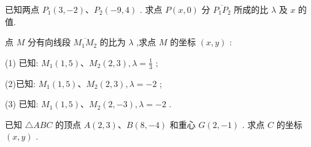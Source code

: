\documentclass[lang=cn,newtx,10.5pt,scheme=chinese]{elegantbook}
\begin{document}
\begin{problemset}[练习]

\item 已知两点 \({P}_{1}\left( {3, - 2}\right) \text{、}{P}_{2}\left( {-9,4}\right)\) . 求点 \(P\left( {x,0}\right)\) 分 \(\overline{{P}_{1}{P}_{2}}\) 所成的比 \(\lambda\) 及 \(x\) 的值.

\item 点 \(M\) 分有向线段 \(\overline{{M}_{1}{M}_{2}}\) 的比为 \(\lambda\) ,求点 \(M\) 的坐标 \(\left( {x,y}\right)\) :

(1) 已知: \({M}_{1}\left( {1,5}\right) \text{、}{M}_{2}\left( {2,3}\right) ,\lambda = \frac{1}{3}\) ;

(2)已知: \({M}_{1}\left( {1,5}\right) \text{、}{M}_{2}\left( {2,3}\right) ,\lambda = - 2\) ;

(3) 已知: \({M}_{1}\left( {1,5}\right) \text{、}{M}_{2}\left( {2, - 3}\right) ,\lambda = - 2\) .

\item 已知 \(\bigtriangleup {ABC}\) 的顶点 \(A\left( {2,3}\right) \text{、}B\left( {8, - 4}\right)\) 和重心 \(G\left( {2, - 1}\right)\) . 求点 \(C\) 的坐标 \(\left( {x,y}\right)\) .

\end{problemset}
\end{document}
